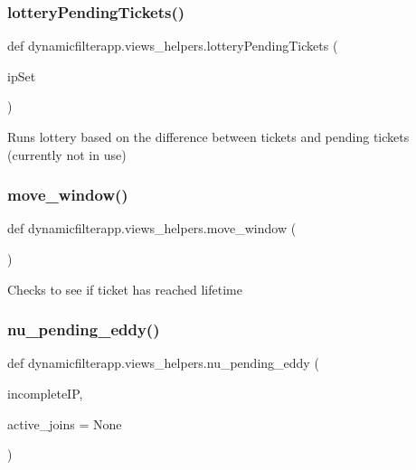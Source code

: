 \subsubsection{\texorpdfstring{lotteryPendingTickets()}{lotteryPendingTickets()}}
{\footnotesize\ttfamily def dynamicfilterapp.\+views\+\_\+helpers.\+lottery\+Pending\+Tickets (\begin{DoxyParamCaption}\item[{}]{ip\+Set }\end{DoxyParamCaption})}

\begin{DoxyVerb}Runs lottery based on the difference between tickets and pending tickets
(currently not in use)
\end{DoxyVerb}
 \mbox{\label{namespacedynamicfilterapp_1_1views__helpers_aa0f3d2407bfd2bfc1074a0fb2f82a336}} 
\subsubsection{\texorpdfstring{move\_window()}{move\_window()}}
{\footnotesize\ttfamily def dynamicfilterapp.\+views\+\_\+helpers.\+move\+\_\+window (\begin{DoxyParamCaption}{ }\end{DoxyParamCaption})}

\begin{DoxyVerb}Checks to see if ticket has reached lifetime
\end{DoxyVerb}
 \mbox{\label{namespacedynamicfilterapp_1_1views__helpers_a0166128faa543e6b533e3fc103de243b}} 
\subsubsection{\texorpdfstring{nu\_pending\_eddy()}{nu\_pending\_eddy()}}
{\footnotesize\ttfamily def dynamicfilterapp.\+views\+\_\+helpers.\+nu\+\_\+pending\+\_\+eddy (\begin{DoxyParamCaption}\item[{}]{incomplete\+IP,  }\item[{}]{active\+\_\+joins = {\ttfamily None} }\end{DoxyParamCaption})}

